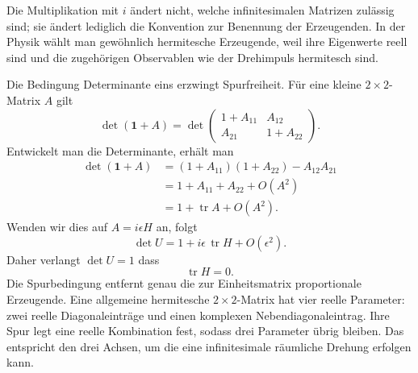 Die Multiplikation mit \(i\) ändert nicht, welche infinitesimalen Matrizen zulässig sind; sie ändert lediglich die Konvention zur Benennung der Erzeugenden. In der Physik wählt man gewöhnlich hermitesche Erzeugende, weil ihre Eigenwerte reell sind und die zugehörigen Observablen wie der Drehimpuls hermitesch sind.

Die Bedingung Determinante eins erzwingt Spurfreiheit. Für eine kleine \(2\times2\)-Matrix \(A\) gilt
\begin{equation}
\det(\boldsymbol 1+A)
=
\det
\begin{pmatrix}
1+A_{11}&A_{12}\\
A_{21}&1+A_{22}
\end{pmatrix}.
\end{equation}
Entwickelt man die Determinante, erhält man
\begin{align}
\det(\boldsymbol 1+A)
 &=(1+A_{11})(1+A_{22})-A_{12}A_{21}\\
 &=1+A_{11}+A_{22}+O(A^2)\\
 &=1+\operatorname{tr}A+O(A^2).
\end{align}
Wenden wir dies auf \(A=i\epsilon H\) an, folgt
\begin{equation}
\det U=1+i\epsilon\,\operatorname{tr}H+O(\epsilon^2).
\end{equation}
Daher verlangt \(\det U=1\)
dass
\begin{equation}
\operatorname{tr}H=0.
\end{equation}
Die Spurbedingung entfernt genau die zur Einheitsmatrix proportionale Erzeugende. Eine allgemeine hermitesche \(2\times2\)-Matrix hat vier reelle Parameter: zwei reelle Diagonaleinträge und einen komplexen Nebendiagonaleintrag. Ihre Spur legt eine reelle Kombination fest, sodass drei Parameter übrig bleiben. Das entspricht den drei Achsen, um die eine infinitesimale räumliche Drehung erfolgen kann.

